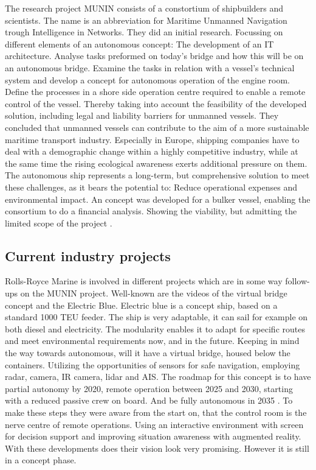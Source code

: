 The research project MUNIN consists of a constortium of shipbuilders and scientists. The name is an abbreviation for Maritime Unmanned Navigation trough Intelligence in Networks. They did an initial research. Focussing on different elements of an autonomous concept: The development of an IT architecture. Analyse tasks preformed on today's bridge and how this will be on an autonomous bridge. Examine the tasks in relation with a vessel’s technical system and develop a concept for autonomous operation of the engine room. Define the processes in a shore side operation centre required to enable a remote control of the vessel. Thereby taking into account the feasibility of the developed solution, including legal and liability barriers for unmanned vessels.
They concluded that unmanned vessels can contribute to the aim of a more sustainable maritime transport industry. Especially in Europe, shipping companies have to deal with a demographic change within a highly competitive industry, while at the same time the rising ecological awareness exerts additional pressure on them. The autonomous ship represents a long-term, but comprehensive solution to meet these challenges, as it bears the potential to: Reduce operational expenses and
environmental impact.
An concept was developed for a bulker vessel, enabling the consortium to do a financial analysis. Showing the viability, but admitting the limited scope of the project \cite{MUNIN2016}.\\

\subsection{Current industry projects}
Rolls-Royce Marine is involved in different projects which are in some way follow-ups on the MUNIN project. Well-known are the videos of the virtual bridge concept and the Electric Blue. Electric blue is a concept ship, based on a standard 1000 \ac{TEU} feeder. The ship is very adaptable, it can sail for example on both diesel and electricity. The modularity enables it to adapt for specific routes and meet environmental requirements now, and in the future. 
Keeping in mind the way towards autonomous, will it have a virtual bridge, housed below the containers. Utilizing the opportunities of sensors for safe navigation, employing radar, camera, IR camera, lidar and \ac{AIS}. The roadmap for this concept is to have partial autonomy by 2020, remote operation between 2025 and 2030, starting with a reduced passive crew on board. And be fully autonomous in 2035 \cite{Wilson2017}. 
To make these steps they were aware from the start on, that the control room is the nerve centre of remote operations. Using an interactive environment with screen for decision support and improving situation awareness with augmented reality. With these developments does their vision look very promising. However it is still in a concept phase.\\

